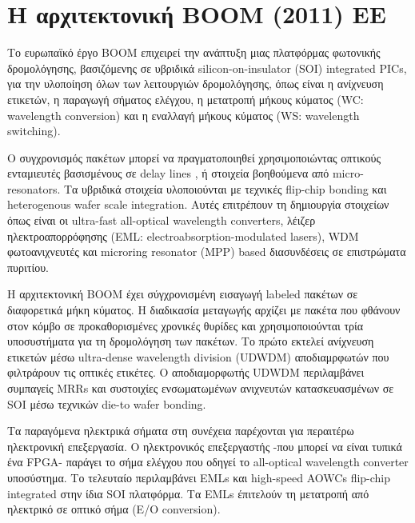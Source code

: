 ﻿\section{Η αρχιτεκτονική BOOM (2011) ΕΕ}



Tο ευρωπαϊκό έργο BOOM επιχειρεί την ανάπτυξη μιας πλατφόρμας
φωτονικής δρομολόγησης, βασιζόμενης σε υβριδικά silicon-on-insulator
(SOI) integrated PICs, για την υλοποίηση όλων των λειτουργιών
δρομολόγησης, όπως είναι η ανίχνευση ετικετών, η παραγωγή σήματος
ελέγχου, η μετατροπή μήκους κύματος (WC: wavelength conversion) και η
εναλλαγή μήκους κύματος (WS: wavelength switching).

Ο συγχρονισμός πακέτων μπορεί να πραγματοποιηθεί χρησιμοποιώντας
οπτικούς ενταμιευτές βασισμένους σε delay lines \cite{5685653}, ή στοιχεία
βοηθούμενα από micro-resonators. Τα υβριδικά στοιχεία υλοποιούνται με
τεχνικές flip-chip bonding και heterogenous wafer scale integration.
Αυτές επιτρέπουν τη δημιουργία στοιχείων όπως είναι οι ultra-fast
all-optical wavelength converters, λέιζερ ηλεκτροαπορρόφησης (EML:
electroabsorption-modulated lasers), WDM φωτοανιχνευτές και microring
resonator (ΜΡΡ) based διασυνδέσεις σε επιστρώματα πυριτίου.

H αρχιτεκτονική BOOM έχει σύγχρονισμένη εισαγωγή labeled πακέτων σε
διαφορετικά μήκη κύματος. Η διαδικασία μεταγωγής αρχίζει με πακέτα που
φθάνουν στον κόμβο σε προκαθορισμένες χρονικές θυρίδες και
χρησιμοποιούνται τρία υποσυστήματα για τη δρομολόγηση των πακέτων.  Το
πρώτο εκτελεί ανίχνευση ετικετών μέσω ultra-dense wavelength division
(UDWDM) αποδιαμρφωτών που φιλτράρουν τις οπτικές ετικέτες. Ο
αποδιαμορφωτής UDWDM περιλαμβάνει συμπαγείς MRRs και συστοιχίες
ενσωματωμένων ανιχνευτών κατασκευασμένων σε SOI μέσω τεχνικών die-to
wafer bonding.

Τα παραγόμενα ηλεκτρικά σήματα στη συνέχεια παρέχονται για περαιτέρω
ηλεκτρονική επεξεργασία.  Ο ηλεκτρονικός επεξεργαστής -που μπορεί να
είναι τυπικά ένα FPGA- παράγει το σήμα ελέγχου που οδηγεί το
all-optical wavelength converter υποσύστημα. Το τελευταίο περιλαμβάνει
EMLs και high-speed AOWCs flip-chip integrated στην ίδια SOI
πλατφόρμα. Τα EMLs έπιτελούν τη μετατροπή από ηλεκτρικό σε οπτικό σήμα
(E/O conversion).

